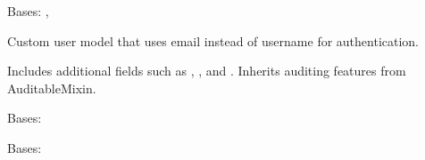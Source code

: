 \documentclass[letterpaper,10pt,english]{sphinxmanual}
\begin{document}
\begin{fulllineitems}
\label{\detokenize{users:users.models.CustomUser}}
\pysigstartsignatures
\pysiglinewithargsret
{}
{\sphinxparamcomma {}}
{}
\pysigstopsignatures
\sphinxAtStartPar
Bases: , {\hyperref[\detokenize{core:core.models.AuditableMixin}]{}}

\sphinxAtStartPar
Custom user model that uses email instead of username for authentication.

\sphinxAtStartPar
Includes additional fields such as , , and .
Inherits auditing features from AuditableMixin.

\begin{fulllineitems}
\label{\detokenize{users:users.models.CustomUser.DoesNotExist}}
\pysigstartsignatures
\pysigline
{}
\pysigstopsignatures
\sphinxAtStartPar
Bases: 

\end{fulllineitems}


\begin{fulllineitems}
\label{\detokenize{users:users.models.CustomUser.MultipleObjectsReturned}}
\pysigstartsignatures
\pysigline
{}
\pysigstopsignatures
\sphinxAtStartPar
Bases: 

\end{fulllineitems}


\begin{fulllineitems}
\label{\detokenize{users:users.models.CustomUser.REQUIRED_FIELDS}}
\pysigstartsignatures
\pysigline
{}
\pysigstopsignatures
\end{fulllineitems}


\end{fulllineitems}
\end{document}
